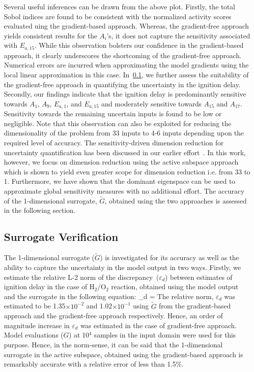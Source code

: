 Several useful inferences can be drawn from the above plot. Firstly, the total Sobol indices are found to be
consistent
with the normalized activity scores evaluated uing the gradient-based approach. Whereas, the gradient-free
approach yields consistent results for the $A_i$'s, it does not capture the sensitivity associated with
$E_{a,15}$. While this observation bolsters our confidence in the gradient-based approach, it clearly
underscores the shortcoming of the gradient-free approach. Numerical errors are incurred when approximating
the model gradients using the local linear approximation in this case. In~\ref{sub:verify}, we further assess the
suitability of the gradient-free approach in quantifying the uncertainty in the ignition delay. 
Secondly, our findings indicate that   
the ignition delay is predominantly sensitive towards $A_1$, $A_9$, $E_{a,1}$, and $E_{a,15}$ and 
moderately sensitive towards $A_{15}$ and $A_{17}$. Sensitivity towards the remaining uncertain inputs is
found to be low or negligible. Note that this observation can also be exploited for reducing the 
dimensionality of the problem from 33 inputs to 4-6 inputs depending upon the required level of accuracy.
The sensitivity-driven dimension reduction for uncertainty quantification has been
discussed in our earlier effort~\cite{Vohra:2018}. In this work, however, we focus on dimension reduction using the active 
subspace approach which is shown to yield even greater scope for dimension reduction i.e. from 33 to 1. Furthermore, we have
shown that the dominant eigenspace can be used to approximate global sensitivity measures with no additional effort.
The accuracy of the 1-dimensional surrogate, $\tilde{G}$, obtained using the two approaches is assessed in the following section. 

\subsection{Surrogate Verification}
\label{sub:verify}

The 1-dimensional surrogate ($\tilde{G}$) is investigated for its accuracy as well as the ability to capture the 
uncertainty in the
model output in two ways. Firstly, we estimate the relative L-2 norm of the discrepancy~($\varepsilon_d$)
between estimates of ignition delay in the case of H$_2$/O$_2$ reaction, obtained using the 
model output and the surrogate in the following equation:
%
\be
\varepsilon_d = 
\ee
%
The relative norm, $\varepsilon_d$ was estimated to be 1.35$\times10^{-2}$ and 1.02$\times10^{-1}$
using $\tilde{G}$ from the gradient-based approach and the gradient-free approach respectively. Hence,
an order of magnitude increase in $\varepsilon_d$ was estimated in the case of gradient-free approach.
Model evaluations ($G$) at 10$^{4}$ samples in the input domain were used for this purpose. 
Hence, in the norm-sense, it can be said that the 1-dimensional surrogate in the active subspace, obtained
using the gradient-based approach is remarkably accurate with a relative error of less than 1.5$\%$.

